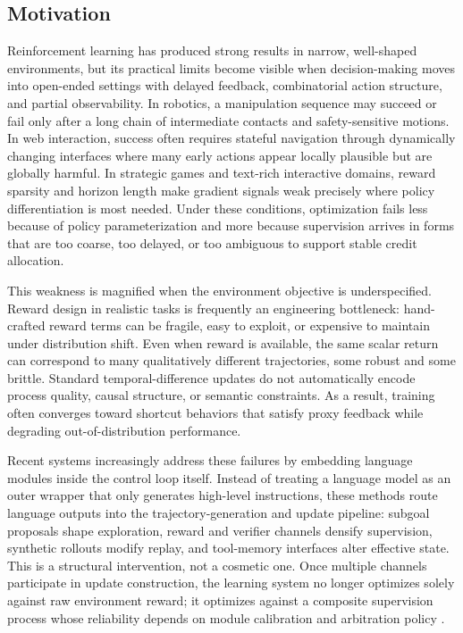 \documentclass[pdflatex,sn-mathphys-num]{sn-jnl}
\begin{document}
\subsection{Motivation}
Reinforcement learning has produced strong results in narrow, well-shaped environments, but its practical limits become visible when decision-making moves into open-ended settings with delayed feedback, combinatorial action structure, and partial observability. In robotics, a manipulation sequence may succeed or fail only after a long chain of intermediate contacts and safety-sensitive motions. In web interaction, success often requires stateful navigation through dynamically changing interfaces where many early actions appear locally plausible but are globally harmful. In strategic games and text-rich interactive domains, reward sparsity and horizon length make gradient signals weak precisely where policy differentiation is most needed. Under these conditions, optimization fails less because of policy parameterization and more because supervision arrives in forms that are too coarse, too delayed, or too ambiguous to support stable credit allocation.

This weakness is magnified when the environment objective is underspecified. Reward design in realistic tasks is frequently an engineering bottleneck: hand-crafted reward terms can be fragile, easy to exploit, or expensive to maintain under distribution shift. Even when reward is available, the same scalar return can correspond to many qualitatively different trajectories, some robust and some brittle. Standard temporal-difference updates do not automatically encode process quality, causal structure, or semantic constraints. As a result, training often converges toward shortcut behaviors that satisfy proxy feedback while degrading out-of-distribution performance.

Recent systems increasingly address these failures by embedding language modules inside the control loop itself. Instead of treating a language model as an outer wrapper that only generates high-level instructions, these methods route language outputs into the trajectory-generation and update pipeline: subgoal proposals shape exploration, reward and verifier channels densify supervision, synthetic rollouts modify replay, and tool-memory interfaces alter effective state. This is a structural intervention, not a cosmetic one. Once multiple channels participate in update construction, the learning system no longer optimizes solely against raw environment reward; it optimizes against a composite supervision process whose reliability depends on module calibration and arbitration policy \cite{arxiv_p_2204_01691,doi_p_10_1109_icra48891_2023_10160591,arxiv_p_2305_16291,arxiv_p_2310_12931,arxiv_p_2404_03648,arxiv_p_2602_16165}.
\end{document}
